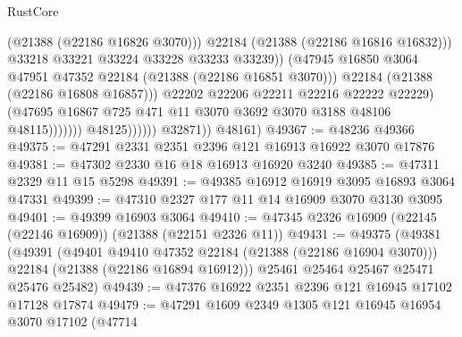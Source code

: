 \begin{lexlean}{RustCore}
\begin{coremodule}
                                              (@21388 (@22186 @16826 @3070)))
                                            @22184
                                            (@21388 (@22186 @16816 @16832)))
                                          @33218
                                          @33221
                                          @33224
                                          @33228
                                          @33233
                                          @33239))
                                      (@47945
                                        @16850
                                        @3064
                                        @47951
                                        @47352
                                        @22184
                                        (@21388 (@22186 @16851 @3070)))
                                      @22184
                                      (@21388 (@22186 @16808 @16857)))
                                    @22202
                                    @22206
                                    @22211
                                    @22216
                                    @22222
                                    @22229)
                                  (@47695
                                    @16867
                                    @725
                                    @471
                                    @11
                                    @3070
                                    @3692
                                    @3070
                                    @3188
                                    @48106
                                    @48115)))))))
                      @48125))))))
          @32871))
      @48161)
@49367 := @48236 @49366
@49375 := @47291 @2331 @2351 @2396 @121 @16913 @16922 @3070 @17876
@49381 := @47302 @2330 @16 @18 @16913 @16920 @3240
@49385 := @47311 @2329 @11 @15 @5298
@49391 := @49385 @16912 @16919 @3095 @16893 @3064 @47331
@49399 := @47310 @2327 @177 @11 @14 @16909 @3070 @3130 @3095
@49401 := @49399 @16903 @3064
@49410 := @47345 @2326 @16909 (@22145 (@22146 @16909)) (@21388 (@22151 @2326 @11))
@49431 := @49375
    (@49381
      (@49391
        (@49401 @49410 @47352 @22184 (@21388 (@22186 @16904 @3070)))
        @22184
        (@21388 (@22186 @16894 @16912)))
      @25461
      @25464
      @25467
      @25471
      @25476
      @25482)
@49439 := @47376 @16922 @2351 @2396 @121 @16945 @17102 @17128 @17874
@49479 := @47291
    @1609
    @2349
    @1305
    @121
    @16945
    @16954
    @3070
    @17102
    (@47714

\end{coremodule}
\end{lexlean}
